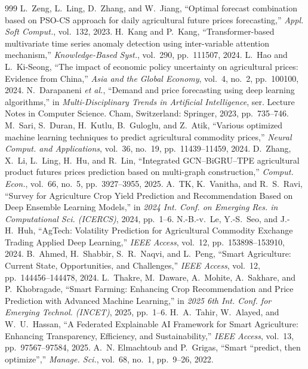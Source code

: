 \begin{thebibliography}{999}
 L.~Zeng, L.~Ling, D.~Zhang, and W.~Jiang, ``Optimal forecast combination based on PSO-CS approach for daily agricultural future prices forecasting,'' \emph{Appl. Soft Comput.}, vol.~132, 2023.
 H.~Kang and P.~Kang, ``Transformer-based multivariate time series anomaly detection using inter-variable attention mechanism,'' \emph{Knowledge-Based Syst.}, vol.~290, pp.~111507, 2024.
 L.~Hao and L.~Ki-Seong, ``The impact of economic policy uncertainty on agricultural prices: Evidence from China,'' \emph{Asia and the Global Economy}, vol.~4, no.~2, pp.~100100, 2024.
 N.~Darapaneni \emph{et al.}, ``Demand and price forecasting using deep learning algorithms,'' in \emph{Multi-Disciplinary Trends in Artificial Intelligence}, ser. Lecture Notes in Computer Science. Cham, Switzerland: Springer, 2023, pp.~735--746.
 M.~Sari, S.~Duran, H.~Kutlu, B.~Guloglu, and Z.~Atik, ``Various optimized machine learning techniques to predict agricultural commodity prices,'' \emph{Neural Comput. and Applications}, vol.~36, no.~19, pp.~11439--11459, 2024.
 D.~Zhang, X.~Li, L.~Ling, H.~Hu, and R.~Lin, ``Integrated GCN--BiGRU--TPE agricultural product futures prices prediction based on multi-graph construction,'' \emph{Comput. Econ.}, vol.~66, no.~5, pp.~3927--3955, 2025.
 A.~TK, K.~Vanitha, and R.~S.~Ravi, ``Survey for Agriculture Crop Yield Prediction and Recommendation Based on Deep Ensemble Learning Models,'' in \emph{2024 Int. Conf. on Emerging Res. in Computational Sci. (ICERCS)}, 2024, pp.~1--6.
 N.-B.-v.~Le, Y.-S.~Seo, and J.-H.~Huh, ``AgTech: Volatility Prediction for Agricultural Commodity Exchange Trading Applied Deep Learning,'' \emph{IEEE Access}, vol.~12, pp.~153898--153910, 2024.
 B.~Ahmed, H.~Shabbir, S.~R.~Naqvi, and L.~Peng, ``Smart Agriculture: Current State, Opportunities, and Challenges,'' \emph{IEEE Access}, vol.~12, pp.~144456--144478, 2024.
 L.~Thakre, M.~Daware, A.~Mohite, A.~Sakhare, and P.~Khobragade, ``Smart Farming: Enhancing Crop Recommendation and Price Prediction with Advanced Machine Learning,'' in \emph{2025 6th Int. Conf. for Emerging Technol. (INCET)}, 2025, pp.~1--6.
 H.~A.~Tahir, W.~Alayed, and W.~U.~Hassan, ``A Federated Explainable AI Framework for Smart Agriculture: Enhancing Transparency, Efficiency, and Sustainability,'' \emph{IEEE Access}, vol.~13, pp.~97567--97584, 2025.
 A.~N. Elmachtoub and P.~Grigas, ``Smart ``predict, then optimize'','' \emph{Manage. Sci.}, vol.~68, no.~1, pp.~9--26, 2022.

\end{thebibliography}
